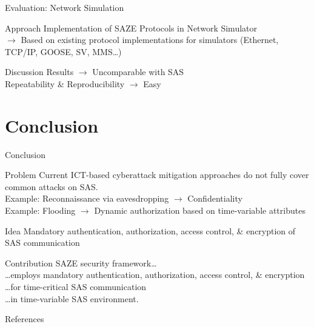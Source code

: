 \documentclass[en]{sdqbeamer}
\begin{document}
\begin{frame}{Evaluation: Network Simulation}
    \begin{greenblock}{Approach}
        Implementation of SAZE Protocols in Network Simulator
        \\$\rightarrow$ Based on existing protocol implementations for simulators (Ethernet, TCP/IP, GOOSE, SV, MMS\dots)
    \end{greenblock}
    \begin{blueblock}{Discussion}
        Results $\rightarrow$ Uncomparable with SAS
        \\Repeatability \& Reproducibility $\rightarrow$ Easy
    \end{blueblock}
\end{frame}

\section{Conclusion}
\begin{frame}{Conclusion}
    \begin{redblock}{Problem}
        Current ICT-based cyberattack mitigation approaches do not fully cover common attacks on SAS.
        \\Example: Reconnaissance via eavesdropping $\rightarrow$ Confidentiality
        \\Example: Flooding $\rightarrow$ Dynamic authorization based on time-variable attributes
    \end{redblock}
    \begin{greenblock}{Idea}
        Mandatory authentication, authorization, access control, \& encryption of SAS communication
    \end{greenblock}
    \begin{blueblock}{Contribution}
        SAZE security framework\dots
        \\\dots employs mandatory authentication, authorization, access control, \& encryption
        \\\dots for time-critical SAS communication
        \\\dots in time-variable SAS environment.
    \end{blueblock}
\end{frame}

\appendix
\beginbackup

\begin{frame}[allowframebreaks]{References}
\printbibliography
\end{frame}

\backupend
\end{document}
